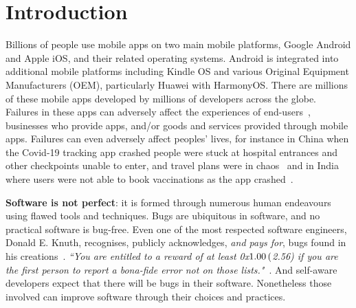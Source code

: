 \chapter{Introduction}
\label{the-introduction}

Billions of people use mobile apps on two main mobile platforms, Google Android and Apple iOS, and their related operating systems.  Android is integrated into additional mobile platforms including Kindle OS and various Original Equipment Manufacturers (OEM), particularly Huawei with HarmonyOS. There are millions of these mobile apps developed by millions of developers across the globe. Failures in these apps can adversely affect the experiences of end-users~\citep{bbcnews2020_nhs_covid_19_app_bluescreen_glitch}, businesses who provide apps, and/or goods and services provided through mobile apps. Failures can even adversely affect peoples' lives, for instance in China when the Covid-19 tracking app crashed people were stuck at hospital entrances and other checkpoints unable to enter, and travel plans were in chaos~\citep{scmp2021_chinas_covid_19_tracking_app_crashes} and in India where users were not able to book vaccinations as the app crashed~\citep{moneycontrolnews2021_cowin_apps_crash}.

\textbf{Software is not perfect}: it is formed through numerous human endeavours using flawed tools and techniques.
Bugs are ubiquitous in software, and no practical software is bug-free. Even one of the most respected software engineers, Donald E. Knuth, recognises, publicly acknowledges, \emph{and pays for}, bugs found in his creations~\citep{knuth_trutex, wikipedia__knuth_reward_checks_2020}. \emph{``You are entitled to a reward of at least 0x$1.00 \nobreak\hspace{.16667em plus .08333em} ($2.56) if you are the first person to report a bona-fide error not on those lists."}~\citep{knuth_the_bank_of_san_serriffe}. And self-aware developers expect that there will be bugs in their software. Nonetheless those involved can improve software through their choices and practices.



